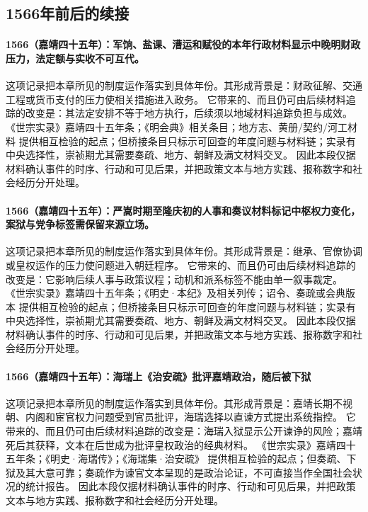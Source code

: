 \subsection{1566年前后的续接}

\paragraph{1566（嘉靖四十五年）：军饷、盐课、漕运和赋役的本年行政材料显示中晚明财政压力，法定额与实收不可互代。} 这项记录把本章所见的制度运作落实到具体年份。其形成背景是：财政征解、交通工程或货币支付的压力使相关措施进入政务。 它带来的、而且仍可由后续材料追踪的改变是：其法定安排不等于地方执行，后续须以地域材料追踪负担与成效。 《世宗实录》嘉靖四十五年条；《明会典》相关条目；地方志、黄册/契约/河工材料 提供相互检验的起点；但桥接条目只标示可回查的年度问题与材料链；实录有中央选择性，崇祯期尤其需要奏疏、地方、朝鲜及满文材料交叉。 因此本段仅据材料确认事件的时序、行动和可见后果，并把政策文本与地方实践、报称数字和社会经历分开处理。

\paragraph{1566（嘉靖四十五年）：严嵩时期至隆庆初的人事和奏议材料标记中枢权力变化，案狱与党争标签需保留来源立场。} 这项记录把本章所见的制度运作落实到具体年份。其形成背景是：继承、官僚协调或皇权运作的压力使问题进入朝廷程序。 它带来的、而且仍可由后续材料追踪的改变是：它影响后续人事与政策议程；动机和派系标签不能由单一叙事裁定。 《世宗实录》嘉靖四十五年条；《明史·本纪》及相关列传；诏令、奏疏或会典版本 提供相互检验的起点；但桥接条目只标示可回查的年度问题与材料链；实录有中央选择性，崇祯期尤其需要奏疏、地方、朝鲜及满文材料交叉。 因此本段仅据材料确认事件的时序、行动和可见后果，并把政策文本与地方实践、报称数字和社会经历分开处理。

\paragraph{1566（嘉靖四十五年）：海瑞上《治安疏》批评嘉靖政治，随后被下狱} 这项记录把本章所见的制度运作落实到具体年份。其形成背景是：嘉靖长期不视朝、内阁和宦官权力问题受到官员批评，海瑞选择以直谏方式提出系统指控。 它带来的、而且仍可由后续材料追踪的改变是：海瑞入狱显示公开谏诤的风险；嘉靖死后其获释，文本在后世成为批评皇权政治的经典材料。 《世宗实录》嘉靖四十五年条；《明史·海瑞传》；《海瑞集·治安疏》 提供相互检验的起点；但奏疏、下狱及其大意可靠；奏疏作为谏官文本呈现的是政治论证，不可直接当作全国社会状况的统计报告。 因此本段仅据材料确认事件的时序、行动和可见后果，并把政策文本与地方实践、报称数字和社会经历分开处理。

